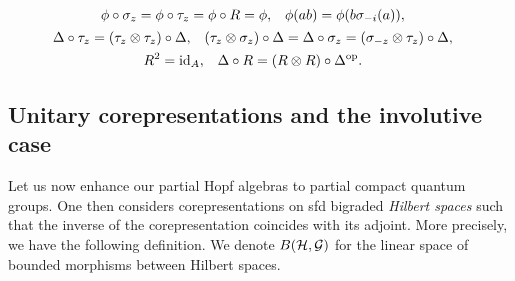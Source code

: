   \begin{gather}
    \begin{aligned} \label{eq:modular}
      \phi\circ \sigma_{z} &= \phi \circ \tau_{z} = \phi \circ R =
      \phi, & \phi(ab) &= \phi(b\sigma_{-i}(a)),
    \end{aligned}
\\ \label{eq:scaling-modular-delta}
    \begin{aligned} 
    \Delta \circ \tau_{z} &= (\tau_{z} \otimes \tau_{z}) \circ \Delta,
    & (\tau_{z} \otimes \sigma_{z}) \circ \Delta &= \Delta \circ
    \sigma_{z} = (\sigma_{-z} \otimes \tau_{z}) \circ \Delta,      
  \end{aligned} \\
  \begin{aligned} \label{eq:unitary-antipode}
    R^{2} &= \operatorname{id}_{A}, & \Delta \circ R &= (R \otimes R) \circ
    \Delta^{\operatorname{\mathrm{op}}}.
  \end{aligned}
  \end{gather}



\subsection{Unitary corepresentations and the involutive case}


Let us now enhance our partial Hopf algebras to partial compact quantum groups. One then considers corepresentations on sfd bigraded \emph{Hilbert spaces} such that the inverse of the corepresentation coincides with its adjoint. More precisely, we have the following definition. We denote $B(\mathcal{H},\mathcal{G})$ for the linear space of bounded morphisms between Hilbert spaces.


